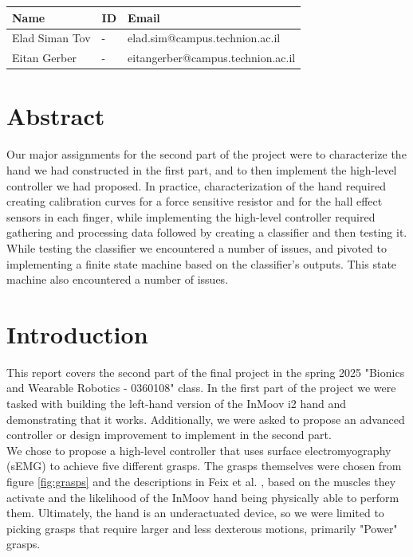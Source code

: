 \documentclass[10pt]{article}
\begin{document}
\begin{table}[h]
    \centering
    \begin{tabular}{l l l}
        \hline
        Name & ID & Email \\
        \hline
        Elad Siman Tov & - & elad.sim@campus.technion.ac.il \\
        \hline
        Eitan Gerber & - & eitangerber@campus.technion.ac.il \\
        \hline
    \end{tabular}
    \label{tab:personal_info}
\end{table}

\section*{Abstract}
Our major assignments for the second part of the project were to characterize the hand we had constructed in the first part, and to then implement the high-level controller we had proposed. In practice, characterization of the hand required creating calibration curves for a force sensitive resistor and for the hall effect sensors in each finger, while implementing the high-level controller required gathering and processing data followed by creating a classifier and then testing it.\\
While testing the classifier we encountered a number of issues, and pivoted to implementing a finite state machine based on the classifier's outputs. This state machine also encountered a number of issues.

\section{Introduction}
This report covers the second part of the final project in the spring 2025 "Bionics and Wearable Robotics - 0360108" class. In the first part of the project we were tasked with building the left-hand version of the InMoov i2 hand \cite{langevin_inmoov_nodate} and demonstrating that it works. Additionally, we were asked to propose an advanced controller or design improvement to implement in the second part.\\
We chose to propose a high-level controller that uses surface electromyography (sEMG) to achieve five different grasps. The grasps themselves were chosen from figure \ref{fig:grasps} and the descriptions in Feix et al. \cite{feix_grasp_2016}, based on the muscles they activate and the likelihood of the InMoov hand being physically able to perform them. Ultimately, the hand is an underactuated device, so we were limited to picking grasps that require larger and less dexterous motions, primarily "Power" grasps. 
\end{document}
